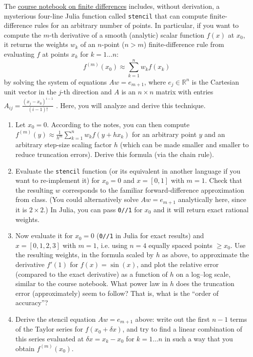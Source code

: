 \documentclass[10pt,oneside]{article}
\begin{document}
The \href{https://github.com/mitmath/matrixcalc/blob/a2c2d3c5f9269f501fa03cd14e3fbe8d219df211/notes/Finite\%20difference\%20checks.ipynb}{course notebook on finite differences}
includes, without derivation, a mysterious four-line Julia function
called \texttt{stencil} that can compute finite-difference rules for
an arbitrary number of points. In particular, if you want to compute
the $m$-th derivative of a smooth (analytic) scalar function $f(x)$
at $x_{0}$, it returns the weights $w_{k}$ of an $n$-point ($n>m$)
finite-difference rule from evaluating $f$ at points $x_{k}$ for
$k=1\ldots n$:
\[
f^{(m)}(x_{0})\approx\sum_{k=1}^{n}w_{k}f(x_{k})
\]
by solving the system of equations $Aw=e_{m+1}$, where $e_{j}\in\mathbb{R}^{n}$
is the Cartesian unit vector in the $j$-th direction and $A$ is
an $n\times n$ matrix with entries $A_{ij}=\frac{(x_{j}-x_{0})^{i-1}}{(i-1)!}$
. Here, you will analyze and derive this technique.
\begin{enumerate}
\item Let $x_{0}=0$. According to the notes, you can then compute $f^{(m)}(y)\approx\frac{1}{h^{m}}\sum_{k=1}^{n}w_{k}f(y+hx_{k})$
for an arbitrary point $y$ and an arbitrary step-size scaling factor
$h$ (which can be made smaller and smaller to reduce truncation errors).
Derive this formula (via the chain rule).
\item Evaluate the \texttt{stencil} function (or its equivalent in another
language if you want to re-implement it) for $x_{0}=0$ and $x=[0,1]$
with $m=1$. Check that the resulting $w$ corresponds to the familiar
forward-difference approximation from class. (You could alternatively
solve $Aw=e_{m+1}$ analytically here, since it is $2\times2$.) In
Julia, you can pass \texttt{0//1} for $x_{0}$ and it will return
exact rational weights.
\item Now evaluate it for $x_{0}=0$ (\texttt{0//1} in Julia for exact results)
and $x=[0,1,2,3]$ with $m=1$, i.e. using $n=4$ equally spaced points
$\ge x_{0}$. Use the resulting weights, in the formula scaled by
$h$ as above, to approximate the derivative $f'(1)$ for $f(x)=\sin(x)$,
and plot the relative error (compared to the exact derivative) as
a function of $h$ on a log–log scale, similar to the course notebook.
What power law in $h$ does the truncation error (approximately) seem
to follow? That is, what is the “order of accuracy”?
\item Derive the stencil equation $Aw=e_{m+1}$ above: write out the first
$n-1$ terms of the Taylor series for $f(x_{0}+\delta x)$, and try
to find a linear combination of this series evaluated at $\delta x=x_{k}-x_{0}$
for $k=1\ldots n$ in such a way that you obtain $f^{(m)}(x_{0})$.
\end{enumerate}
\end{document}
